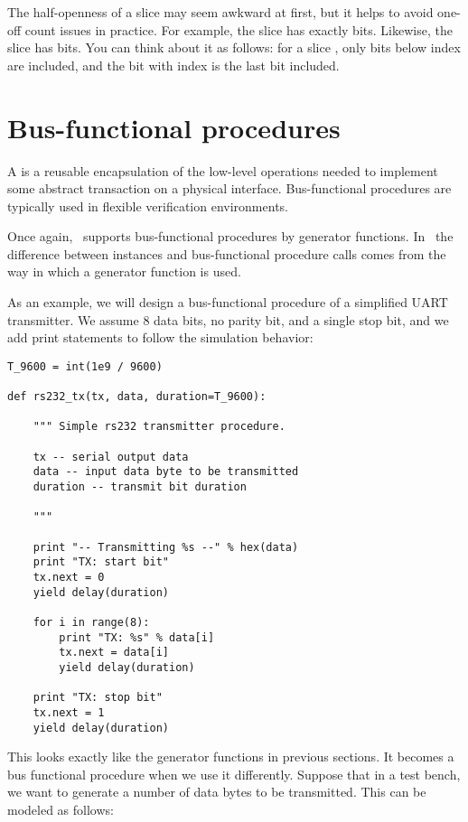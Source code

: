The half-openness of a slice may seem awkward at first, but it helps
to avoid one-off count issues in practice. For example, the slice
 has exactly  bits. Likewise, the slice
 has  bits. You can think about it as
follows: for a slice \code{[i:j]}, only bits below index  are
included, and the bit with index  is the last bit included.


\section{Bus-functional procedures \label{intro-bfm}}

A  is a reusable encapsulation of the
low-level operations needed to implement some abstract transaction on
a physical interface. Bus-functional procedures are typically used in
flexible verification environments.

Once again, \myhdl\ supports bus-functional procedures by generator
functions. In \myhdl\, the difference between instances and
bus-functional procedure calls comes from the way in which a generator
function is used.

As an example, we will design a bus-functional procedure of a
simplified UART transmitter. We assume 8 data bits, no parity bit, and
a single stop bit, and we add print statements to follow the
simulation behavior:

\begin{verbatim}
T_9600 = int(1e9 / 9600)

def rs232_tx(tx, data, duration=T_9600):
    
    """ Simple rs232 transmitter procedure.

    tx -- serial output data
    data -- input data byte to be transmitted
    duration -- transmit bit duration
    
    """

    print "-- Transmitting %s --" % hex(data)
    print "TX: start bit"      
    tx.next = 0
    yield delay(duration)

    for i in range(8):
        print "TX: %s" % data[i]
        tx.next = data[i]
        yield delay(duration)

    print "TX: stop bit"      
    tx.next = 1
    yield delay(duration)
\end{verbatim}

This looks exactly like the generator functions in previous sections. It
becomes a bus functional procedure when we use it differently. Suppose
that in a test bench, we want to generate a number of data bytes to be
transmitted. This can be modeled as follows:


